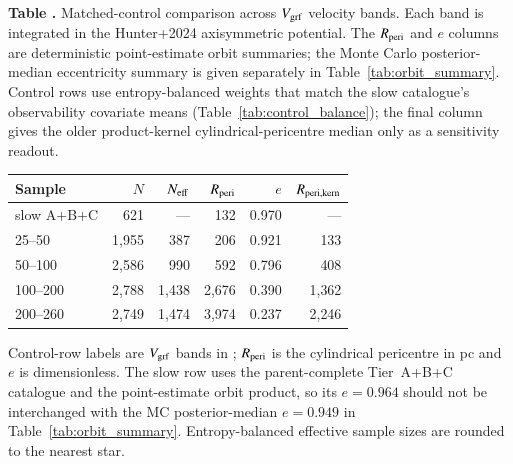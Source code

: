 ﻿\begin{center}
\label{tab:band_comparison}
\begin{minipage}{\columnwidth}
\small\textbf{Table \thetable.} Matched-control comparison across
$V_{\mathrm{grf}}$ velocity bands. Each band is integrated in the Hunter+2024
axisymmetric potential. The $R_{\mathrm{peri}}$ and $e$ columns are deterministic
point-estimate orbit summaries; the Monte Carlo posterior-median
eccentricity summary is given separately in Table~\ref{tab:orbit_summary}.
Control rows use entropy-balanced weights that
match the slow catalogue's observability covariate means
(Table~\ref{tab:control_balance}); the final column gives the older
product-kernel cylindrical-pericentre median only as a sensitivity readout.
\end{minipage}
\vspace{0.4ex}

\small
\setlength{\tabcolsep}{2pt}
\begin{tabular}{@{}lrrrrr@{}}
\hline\hline
Sample & $N$ & $N_{\rm eff}$ & $R_{\mathrm{peri}}$ & $e$ & $R_{\rm peri,kern}$ \\
\hline
slow A+B+C             & 621 & ---   & 132 & 0.970 & --- \\
25--50                 & 1{,}955 & 387   & 206 & 0.921 & 133 \\
50--100                & 2{,}586 & 990   & 592 & 0.796 & 408 \\
100--200               & 2{,}788 & 1{,}438 & 2{,}676 & 0.390 & 1{,}362 \\
200--260               & 2{,}749 & 1{,}474 & 3{,}974 & 0.237 & 2{,}246 \\
\hline
\end{tabular}
\par\smallskip
\footnotesize Control-row labels are $V_{\mathrm{grf}}$ bands in \kms; $R_{\mathrm{peri}}$ is
the cylindrical pericentre in pc and $e$ is dimensionless. The slow row uses the parent-complete
Tier~A+B+C catalogue and the point-estimate orbit product, so its
$e=0.964$ should not be interchanged with the MC posterior-median
$e=0.949$ in Table~\ref{tab:orbit_summary}. Entropy-balanced effective
sample sizes are rounded to the nearest star.
\end{center}
